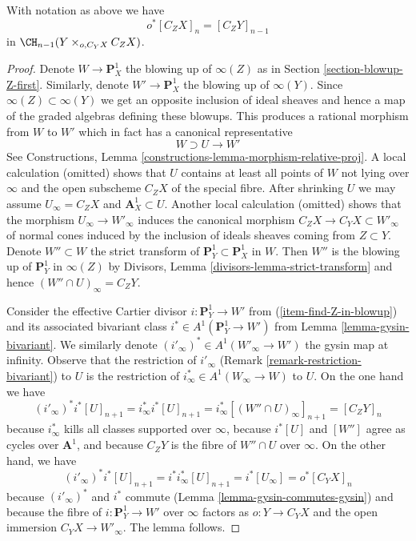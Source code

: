 \begin{lemma}
\label{lemma-relation-normal-cones}
With notation as above we have
$$
o^*[C_ZX]_n = [C_Z Y]_{n - 1}
$$
in $\CH_{n - 1}(Y \times_{o, C_Y X} C_ZX)$.
\end{lemma}

\begin{proof}
Denote $W \to \mathbf{P}^1_X$ the blowing up of $\infty(Z)$ as in
Section \ref{section-blowup-Z-first}.
Similarly, denote $W' \to \mathbf{P}^1_X$ the blowing up of $\infty(Y)$.
Since $\infty(Z) \subset \infty(Y)$ we get an opposite inclusion
of ideal sheaves and hence a map of the graded algebras
defining these blowups. This produces a rational morphism from $W$
to $W'$ which in fact has a canonical representative
$$
W \supset U \longrightarrow W'
$$
See Constructions, Lemma \ref{constructions-lemma-morphism-relative-proj}.
A local calculation (omitted) shows that $U$ contains at least all points
of $W$ not lying over $\infty$ and the open subscheme $C_Z X$ of the special
fibre. After shrinking $U$ we may assume $U_\infty = C_Z X$ and
$\mathbf{A}^1_X \subset U$. Another local calculation (omitted)
shows that the morphism $U_\infty \to W'_\infty$
induces the canonical morphism $C_Z X \to C_Y X \subset W'_\infty$
of normal cones induced by the inclusion of ideals sheaves
coming from $Z \subset Y$. Denote $W'' \subset W$ the strict transform of
$\mathbf{P}^1_Y \subset \mathbf{P}^1_X$ in $W$. Then $W''$ is the blowing
up of $\mathbf{P}^1_Y$ in $\infty(Z)$ by
Divisors, Lemma \ref{divisors-lemma-strict-transform}
and hence $(W'' \cap U)_\infty = C_ZY$.

\medskip\noindent
Consider the effective Cartier divisor $i : \mathbf{P}^1_Y \to W'$
from (\ref{item-find-Z-in-blowup}) and its associated bivariant class
$i^* \in A^1(\mathbf{P}^1_Y \to W')$ from Lemma \ref{lemma-gysin-bivariant}.
We similarly denote $(i'_\infty)^* \in A^1(W'_\infty \to W')$ the
gysin map at infinity. Observe that the restriction of $i'_\infty$
(Remark \ref{remark-restriction-bivariant}) to $U$ is the restriction of
$i_\infty^* \in A^1(W_\infty \to W)$ to $U$. On the one hand we have
$$
(i'_\infty)^* i^* [U]_{n + 1} =
i_\infty^* i^* [U]_{n + 1} =
i_\infty^* [(W'' \cap U)_\infty]_{n + 1} =
[C_ZY]_n
$$
because $i_\infty^*$ kills all classes supported over $\infty$, because
$i^*[U]$ and $[W'']$ agree as cycles over $\mathbf{A}^1$, and because
$C_ZY$ is the fibre of $W'' \cap U$ over $\infty$.
On the other hand, we have
$$
(i'_\infty)^* i^* [U]_{n + 1} =
i^* i_\infty^*[U]_{n + 1} =
i^* [U_\infty] =
o^*[C_YX]_n
$$
because $(i'_\infty)^*$ and $i^*$ commute
(Lemma \ref{lemma-gysin-commutes-gysin})
and because the fibre of $i : \mathbf{P}^1_Y \to W'$ over $\infty$
factors as $o : Y \to C_YX$ and the open immersion $C_YX \to W'_\infty$.
The lemma follows.
\end{proof}

